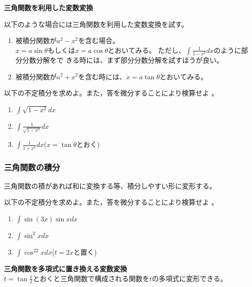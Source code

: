 \documentclass[twocolumn,11pt]{jarticle}
\begin{document}
\noindent
\textbf{三角関数を利用した変数変換}

以下のような場合には三角関数を利用した変数変換を試す。
\begin{enumerate}
\item 被積分関数が$a^2-x^2$を含む場合。\\
  $x=a\sin\theta$もしくは$x=a\cos\theta$とおいてみる。
  ただし、$\displaystyle\int\frac{1}{1-x^2}dx$のように部分分数分解をで
  きる時には、まず部分分数分解を試すほうが良い。
\item 被積分関数が$a^2+x^2$を含む時には、$x=a\tan\theta$とおいてみる。
\end{enumerate}

\exercise
以下の不定積分を求めよ。また，答を微分することにより検算せよ
。
\begin{enumerate}
\item \label{item:sqrt(1-x2)}
  $\displaystyle\int \sqrt{1-x^2} dx$
\item \label{item:1/sqrt(1-x2)}
  $\displaystyle\int \frac{1}{\sqrt{1-x^2}}dx$\quad
\item \label{item:1/1+x2}
$\displaystyle\int\frac{1}{1+x^2}dx$\quad($x=\tan\theta$とおく)
\end{enumerate}

\subsubsection{三角関数の積分}
三角関数の積があれば和に変換する等、積分しやすい形に変形する。

\exercise
以下の不定積分を求めよ。また，答を微分することにより検算せよ
。
\begin{enumerate}
\item \label{item:sin3xsinx}$\displaystyle\int\sin(3x)\sin xdx$
\item \label{item:sin2x}$\displaystyle\int \sin^2 x dx$
\item \label{item:cos22x}$\displaystyle\int \cos^22xdx$\quad ($t=2x$と置く)
\end{enumerate}


\noindent
\textbf{三角関数を多項式に置き換える変数変換}\\
$\displaystyle t=\tan\frac{x}{2}$とおくと三角関数で構成される関数を$t$の多項式に変形できる。
\end{document}
